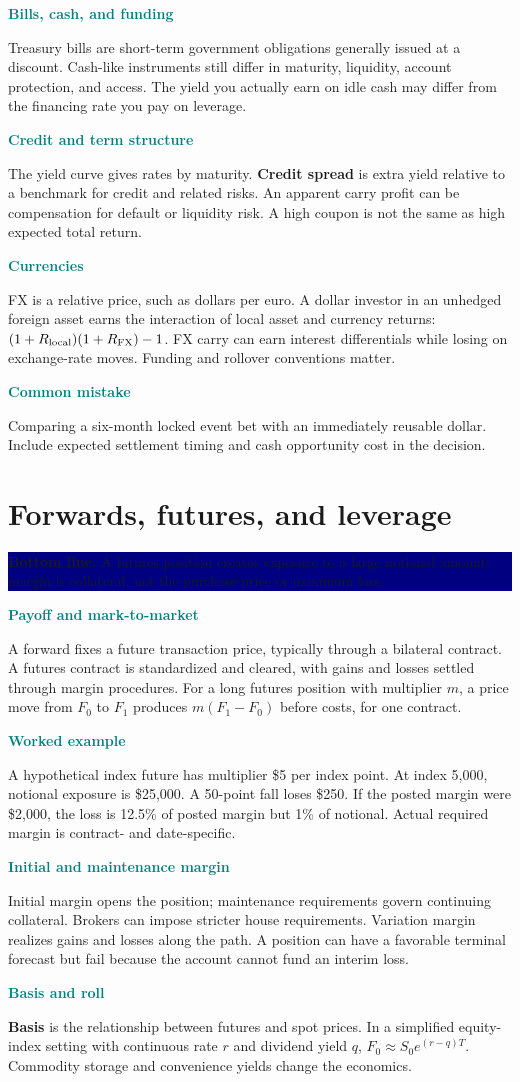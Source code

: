 \documentclass[10pt,letterpaper]{article}
\newcommand{\bl}[1]{\noindent\colorbox{navy}{\parbox{\dimexpr\linewidth-2\fboxsep}{\color{white}\textbf{Bottom line.} #1}}\par\medskip}
\newcommand{\topic}[2]{\clearpage\section{#1}\bl{#2}}
\newcommand{\sub}[1]{\par\textbf{\textcolor{teal}{#1}}\par}
\newcommand{\ex}[1]{\sub{Worked example}#1}
\newcommand{\pit}[1]{\sub{Common mistake}#1}
\begin{document}
\sub{Bills, cash, and funding}
Treasury bills are short-term government obligations generally issued at a discount. Cash-like instruments still differ in maturity, liquidity, account protection, and access. The yield you actually earn on idle cash may differ from the financing rate you pay on leverage.
\sub{Credit and term structure}
The yield curve gives rates by maturity. \textbf{Credit spread} is extra yield relative to a benchmark for credit and related risks. An apparent carry profit can be compensation for default or liquidity risk. A high coupon is not the same as high expected total return.
\sub{Currencies}
FX is a relative price, such as dollars per euro. A dollar investor in an unhedged foreign asset earns the interaction of local asset and currency returns: $(1+R_{\rm local})(1+R_{\rm FX})-1$. FX carry can earn interest differentials while losing on exchange-rate moves. Funding and rollover conventions matter.
\pit{Comparing a six-month locked event bet with an immediately reusable dollar. Include expected settlement timing and cash opportunity cost in the decision.}
\topic{Forwards, futures, and leverage}{A futures position creates exposure to a large notional amount; margin is collateral, not the purchase price or maximum loss.}
\sub{Payoff and mark-to-market}
A forward fixes a future transaction price, typically through a bilateral contract. A futures contract is standardized and cleared, with gains and losses settled through margin procedures. For a long futures position with multiplier $m$, a price move from $F_0$ to $F_1$ produces $m(F_1-F_0)$ before costs, for one contract.
\ex{A hypothetical index future has multiplier \$5 per index point. At index 5,000, notional exposure is \$25,000. A 50-point fall loses \$250. If the posted margin were \$2,000, the loss is 12.5\% of posted margin but 1\% of notional. Actual required margin is contract- and date-specific.}
\sub{Initial and maintenance margin}
Initial margin opens the position; maintenance requirements govern continuing collateral. Brokers can impose stricter house requirements. Variation margin realizes gains and losses along the path. A position can have a favorable terminal forecast but fail because the account cannot fund an interim loss.
\sub{Basis and roll}
\textbf{Basis} is the relationship between futures and spot prices. In a simplified equity-index setting with continuous rate $r$ and dividend yield $q$, $F_0\approx S_0e^{(r-q)T}$. Commodity storage and convenience yields change the economics.
\end{document}
